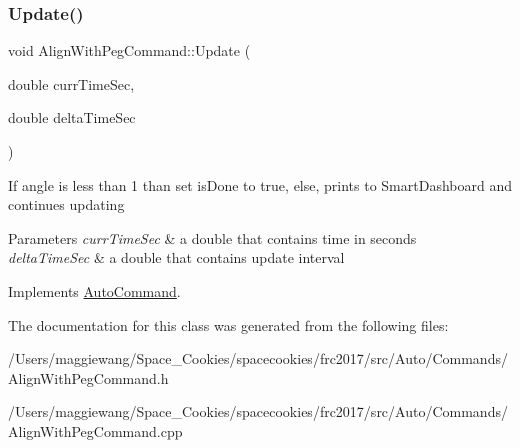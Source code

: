 \subsubsection{\texorpdfstring{Update()}{Update()}}
{\footnotesize\ttfamily void Align\+With\+Peg\+Command\+::\+Update (\begin{DoxyParamCaption}\item[{double}]{curr\+Time\+Sec,  }\item[{double}]{delta\+Time\+Sec }\end{DoxyParamCaption})\hspace{0.3cm}{\ttfamily [virtual]}}

If angle is less than 1 than set is\+Done to true, else, prints to Smart\+Dashboard and continues updating 
\begin{DoxyParams}{Parameters}
{\em curr\+Time\+Sec} & a double that contains time in seconds \\
\hline
{\em delta\+Time\+Sec} & a double that contains update interval \\
\hline
\end{DoxyParams}


Implements \hyperlink{class_auto_command}{Auto\+Command}.



The documentation for this class was generated from the following files\+:\begin{DoxyCompactItemize}
\item 
/\+Users/maggiewang/\+Space\+\_\+\+Cookies/spacecookies/frc2017/src/\+Auto/\+Commands/Align\+With\+Peg\+Command.\+h\item 
/\+Users/maggiewang/\+Space\+\_\+\+Cookies/spacecookies/frc2017/src/\+Auto/\+Commands/Align\+With\+Peg\+Command.\+cpp\end{DoxyCompactItemize}
